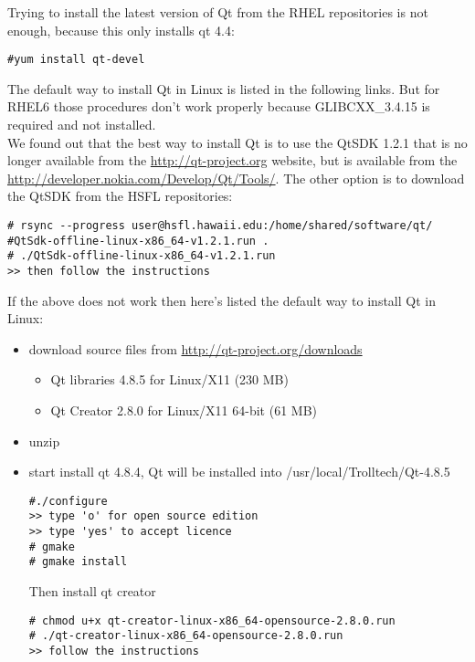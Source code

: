 \documentclass{article}
\begin{document}
Trying to install the latest version of Qt from the RHEL repositories is not enough, because this only installs qt 4.4:
\begin{lstlisting}[style=BashInputStyle]
#yum install qt-devel
\end{lstlisting}

The default way to install Qt in Linux is listed in the following links. But for RHEL6 those procedures don't work properly because GLIBCXX\_3.4.15 is required and not installed. \\

We found out that the best way to install Qt is to use the QtSDK 1.2.1 that is no longer available from the \url{http://qt-project.org} website, but is available from the \url{http://developer.nokia.com/Develop/Qt/Tools/}. The other option is to download the QtSDK from the HSFL repositories:

\begin{lstlisting}[style=BashInputStyle]
# rsync --progress user@hsfl.hawaii.edu:/home/shared/software/qt/
#QtSdk-offline-linux-x86_64-v1.2.1.run .
# ./QtSdk-offline-linux-x86_64-v1.2.1.run
>> then follow the instructions
\end{lstlisting}
	
If the above does not work then here's listed the default way to install Qt in Linux: \\

\begin{itemize}
\item download source files from \url{http://qt-project.org/downloads}
\begin{itemize}
\item Qt libraries 4.8.5 for Linux/X11 (230 MB)
\item Qt Creator 2.8.0 for Linux/X11 64-bit (61 MB)
\end{itemize}
\item unzip
\item start install qt 4.8.4, Qt will be installed into /usr/local/Trolltech/Qt-4.8.5
\begin{lstlisting}[style=BashInputStyle]
#./configure
>> type 'o' for open source edition
>> type 'yes' to accept licence
# gmake
# gmake install
\end{lstlisting}

Then install qt creator
\begin{lstlisting}[style=BashInputStyle]
# chmod u+x qt-creator-linux-x86_64-opensource-2.8.0.run
# ./qt-creator-linux-x86_64-opensource-2.8.0.run
>> follow the instructions
\end{lstlisting}


\end{itemize}
\end{document}
